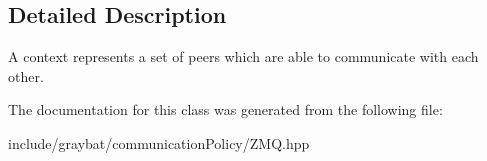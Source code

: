 \subsection{Detailed Description}
A context represents a set of peers which are able to communicate with each other. 

The documentation for this class was generated from the following file\+:\begin{DoxyCompactItemize}
\item 
include/graybat/communication\+Policy/Z\+M\+Q.\+hpp\end{DoxyCompactItemize}
